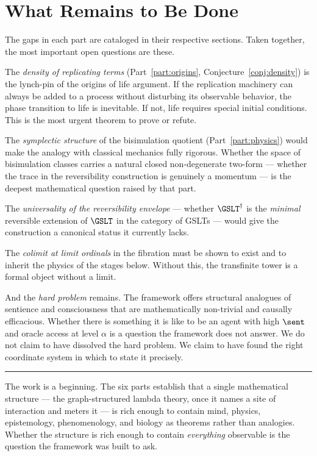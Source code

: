 \chapter*{What Remains to Be Done}

The gaps in each part are cataloged in their respective sections.
Taken together, the most important open questions are these.

The \emph{density of replicating terms}
(Part~\ref{part:origins}, Conjecture~\ref{conj:density}) is
the lynch-pin of the origins of life argument.
If the replication machinery can always be added to a process
without disturbing its observable behavior, the phase transition
to life is inevitable.
If not, life requires special initial conditions.
This is the most urgent theorem to prove or refute.

The \emph{symplectic structure} of the bisimulation quotient
(Part~\ref{part:physics}) would make the analogy with classical
mechanics fully
rigorous.
Whether the space of bisimulation classes carries a natural
closed non-degenerate two-form --- whether the trace in the
reversibility construction is genuinely a momentum --- is the
deepest mathematical question raised by that part.

The \emph{universality of the reversibility envelope} --- whether
$\GSLT^\dagger$ is the \emph{minimal} reversible extension of
$\GSLT$ in the category of GSLTs --- would give the construction
a canonical status it currently lacks.

The \emph{colimit at limit ordinals} in the fibration must be
shown to exist and to inherit the physics of the stages below.
Without this, the transfinite tower is a formal object without
a limit.

And the \emph{hard problem} remains.
The framework offers structural analogues of sentience and
consciousness that are mathematically non-trivial and causally
efficacious.
Whether there is something it is like to be an agent with high
$\sent$ and oracle access at level $\alpha$ is a question the
framework does not answer.
We do not claim to have dissolved the hard problem.
We claim to have found the right coordinate system in which to
state it precisely.

\vspace{2em}
\noindent\hrule
\vspace{1em}

\noindent
The work is a beginning.
The six parts establish that a single mathematical structure ---
the graph-structured lambda theory, once it names a site of interaction
and meters it --- is rich enough to contain mind, physics, epistemology,
phenomenology, and biology as theorems rather than analogies.
Whether the structure is rich enough to contain \emph{everything}
observable is the question the framework was built to ask.
